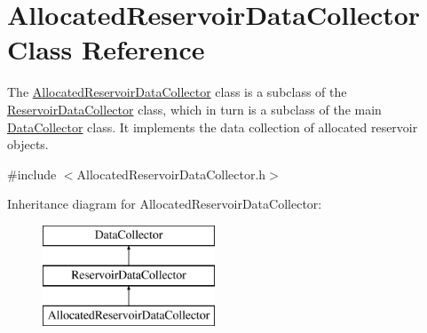 \hypertarget{classAllocatedReservoirDataCollector}{}\section{Allocated\+Reservoir\+Data\+Collector Class Reference}
\label{classAllocatedReservoirDataCollector}


The {\ttfamily \mbox{\hyperlink{classAllocatedReservoirDataCollector}{Allocated\+Reservoir\+Data\+Collector}}} class is a subclass of the {\ttfamily \mbox{\hyperlink{classReservoirDataCollector}{Reservoir\+Data\+Collector}}} class, which in turn is a subclass of the main {\ttfamily \mbox{\hyperlink{classDataCollector}{Data\+Collector}}} class. It implements the data collection of allocated reservoir objects.  




{\ttfamily \#include $<$Allocated\+Reservoir\+Data\+Collector.\+h$>$}

Inheritance diagram for Allocated\+Reservoir\+Data\+Collector\+:\begin{figure}[H]
\begin{center}
\leavevmode
\includegraphics[height=3.000000cm]{classAllocatedReservoirDataCollector}
\end{center}
\end{figure}
